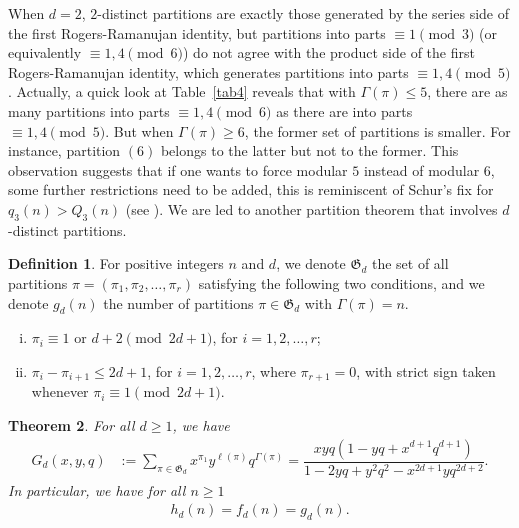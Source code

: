 \documentclass[12pt]{amsart}
\numberwithin{equation}{section}
\theoremstyle{plain}
\newtheorem{theorem}{Theorem}[section]
\theoremstyle{definition}
\newtheorem{Def}[theorem]{Definition}
\def\G{\mathfrak{G}}
\def\G{\mathcal{G}}
\def\G{\mathfrak{G}}
\begin{document}
When $d=2$, $2$-distinct partitions are exactly those generated by the series side of the first Rogers-Ramanujan identity, but partitions into parts $\equiv 1 \pmod 3$ (or equivalently $\equiv 1,4 \pmod 6$) do not agree with the product side of the first Rogers-Ramanujan identity, which generates partitions into parts $\equiv 1,4 \pmod 5$. Actually, a quick look at Table~\ref{tab4} reveals that with $\Gamma(\pi)\leq 5$, there are as many partitions into parts $\equiv 1,4 \pmod 6$ as there are into parts $\equiv 1,4 \pmod 5$. But when $\Gamma(\pi)\geq 6$, the former set of partitions is smaller. For instance, partition $(6)$ belongs to the latter but not to the former. This observation suggests that if one wants to force modular $5$ instead of modular $6$, some further restrictions need to be added, this is reminiscent of Schur's fix for $q_3(n)>Q_3(n)$ (see \cite[Section 4.4]{AE}). We are led to another partition theorem that involves $d$-distinct partitions.
\begin{Def}\label{defgd}
For positive integers $n$ and $d$, we denote $\G_d$ the set of all partitions $\pi=(\pi_1,\pi_2,\ldots,\pi_r)$ satisfying the following two conditions, and we denote $g_d(n)$ the number of partitions $\pi\in \G_d$ with $\Gamma(\pi)=n$.
\begin{enumerate}[i.]
\item $\pi_i\equiv 1 \text{ or } d+2 \pmod{2d+1}$, for $i=1,2,\ldots,r$;
\item $\pi_i-\pi_{i+1}\leq 2d+1$, for $i=1,2,\ldots,r$, where $\pi_{r+1}=0$, with strict sign taken whenever $\pi_i\equiv 1\pmod{2d+1}$.
\end{enumerate}
\end{Def}
\begin{theorem}\label{gen2}
For all $d\geq 1$, we have
\begin{align}
G_d(x,y,q) &:=\sum\limits_{\pi\in\G_d}x^{\pi_1}y^{\ell(\pi)}q^{\Gamma(\pi)}=\dfrac{xyq(1-yq+x^{d+1}q^{d+1})}{1-2yq+y^2q^2-x^{2d+1}yq^{2d+2}}.
\label{gfGd}
\end{align}
In particular, we have for all $n\geq 1$
\begin{align}\label{h=f=g}
h_d(n)=f_d(n)=g_d(n).
\end{align}
\end{theorem}
\end{document}
